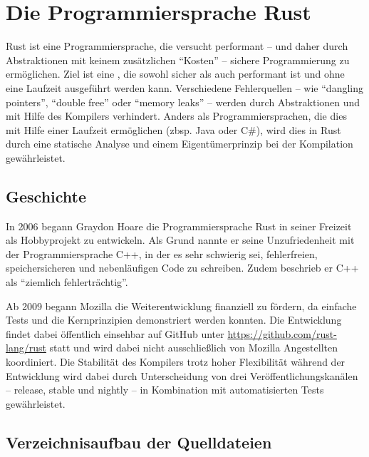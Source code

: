 
\chapter{Die Programmiersprache Rust}

Rust ist eine Programmiersprache, die versucht performant -- und daher durch Abstraktionen mit keinem zusätzlichen \enquote{Kosten}  -- sichere Programmierung zu ermöglichen.
Ziel ist eine , die sowohl sicher  als auch performant ist und ohne eine Laufzeit ausgeführt werden kann.
Verschiedene Fehlerquellen -- wie \enquote{dangling pointers}, \enquote{double free} oder \enquote{memory leaks}  --  werden durch Abstraktionen und mit Hilfe des Kompilers verhindert.
Anders als Programmiersprachen, die dies mit Hilfe einer Laufzeit ermöglichen (zbsp. Java oder C\#), wird dies in Rust durch eine statische Analyse und einem Eigentümerprinzip bei der Kompilation gewährleistet.


\section{Geschichte}
\label{rust:history}

In 2006 \cite{rust:faq} begann Graydon Hoare die Programmiersprache Rust in seiner Freizeit als Hobbyprojekt zu entwickeln.
Als Grund nannte er seine Unzufriedenheit mit der Programmiersprache C++, in der es sehr schwierig sei, fehlerfreien, speichersicheren und nebenläufigen Code zu schreiben.
Zudem beschrieb er C++ als \enquote{ziemlich fehlerträchtig}. \cite{rust:heise_interview_graydon}

Ab 2009 begann Mozilla die Weiterentwicklung finanziell zu fördern, da einfache Tests und die Kernprinzipien demonstriert werden konnten.
Die Entwicklung findet dabei öffentlich einsehbar auf GitHub unter \url{https://github.com/rust-lang/rust} statt und wird dabei nicht ausschließlich von Mozilla Angestellten koordiniert.
Die Stabilität des Kompilers trotz hoher Flexibilität während der Entwicklung wird dabei durch Unterscheidung von drei Veröffentlichungskanälen -- release, stable und nightly -- in Kombination mit automatisierten Tests  gewährleistet. \cite{rust:faq}




\section{Verzeichnisaufbau der Quelldateien}


